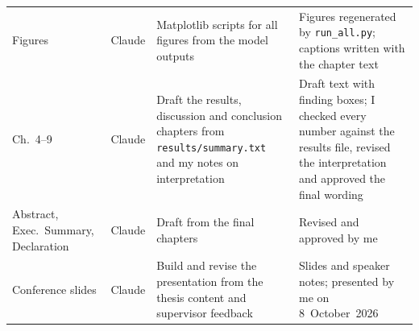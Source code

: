 \documentclass[12pt,a4paper]{report}
\begin{document}
\begin{longtable}{>{\raggedright\arraybackslash}p{2.2cm}
  >{\raggedright\arraybackslash}p{1.6cm}
  >{\raggedright\arraybackslash}p{4.3cm}
  >{\raggedright\arraybackslash}p{6.0cm}}
Figures & Claude & Matplotlib scripts for all figures from the model outputs & Figures regenerated by \texttt{run\_all.py}; captions written with the chapter text \\
Ch.~4--9 & Claude & Draft the results, discussion and conclusion chapters from \texttt{results/summary.txt} and my notes on interpretation & Draft text with finding boxes; I checked every number against the results file, revised the interpretation and approved the final wording \\
Abstract, Exec.\ Summary, Declaration & Claude & Draft from the final chapters & Revised and approved by me \\
Conference slides & Claude & Build and revise the presentation from the thesis content and supervisor feedback & Slides and speaker notes; presented by me on 8~October~2026 \\
\end{longtable}
\end{document}
